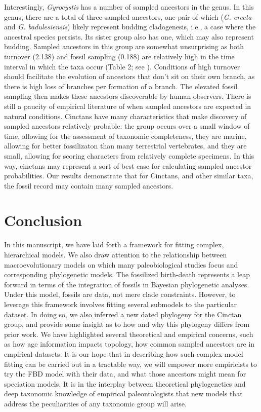 \documentclass{article}
\begin{document}
Interestingly, \textit{Gyrocystis} has a number of sampled ancestors in the genus. In this genus, there are a total of three sampled ancestors, one pair of which (\textit{G. erecta} and \textit{G. badulesiensis}) likely represent budding cladogenesis, i.e., a case where the ancestral species persists.
Its sister group also has one, which may also represent budding.
Sampled ancestors in this group are somewhat unsurprising as both turnover (2.138) and fossil sampling (0.188) are relatively high in the time interval in which the taxa occur (Table 2; see \citep{Foote1996c}). 
Conditions of high turnover should facilitate the evolution of ancestors that don't sit on their own branch, as there is high loss of branches per formation of a branch.
The elevated fossil sampling then makes these ancestors discoverable by human observers. 
There is still a paucity of empirical literature of when sampled ancestors are expected in natural conditions.
Cinctans have many characteristics that make discovery of sampled ancestors relatively probable: the group occurs over a small window of time, allowing for the assessment of taxonomic completeness, they are marine, allowing for better fossilizaton than many terrestrial vertebrates, and they are small, allowing for scoring characters from relatively complete specimens.
In this way, cinctans may represent a sort of best case for calculating sampled ancestor probabilities.
Our results demonstrate that for Cinctans, and other similar taxa, the fossil record may contain many sampled ancestors.

\section{Conclusion}

In this manuscript, we have laid forth a framework for fitting complex, hierarchical models. We also draw attention to the relationship between macroevolutionary models on which many paleobiological studies focus and corresponding phylogenetic models. 
The fossilized birth-death represents a leap forward in terms of the integration of fossils in Bayesian phylogenetic analyses. 
Under this model, fossils are data, not mere clade constraints.
However, to leverage this framework involves fitting several submodels to the particular dataset.
In doing so, we also inferred a new dated phylogeny for the Cinctan group, and provide some insight as to how and why this phylogeny differs from prior work.
We have highlighted several theoretical and empirical concerns, such as how age information impacts topology, how common sampled ancestors are in empirical datasets.
It is our hope that in describing how such complex model fitting can be carried out in a tractable way, we will empower more empiricists to try the FBD model with their data, and what those ancestors might mean for speciation models.
It is in the interplay between theoretical phylogenetics and deep taxonomic knowledge of empirical paleontologists that new models that address the peculiarities of any taxonomic group will arise.
\end{document}
